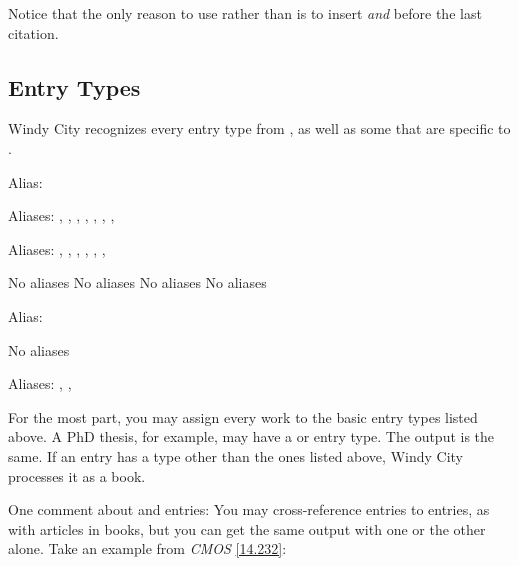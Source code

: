 \documentclass[11pt,letterpaper,oneside]{article}
\begin{document}
Notice that the only reason to use  rather than
 is to insert \textit{and} before the last citation.

\subsection{Entry Types}
\label{entrytypes}

Windy City recognizes every entry type from \BibTeX, as well as some
that are specific to \biblatex.

\begin{typelist}
\RaggedRight


Alias: 


Aliases: , , ,
, , ,
, 


Aliases: , ,
, , ,
, 

 No aliases
 No aliases
 No aliases
 No aliases


Alias: 

 No aliases


Aliases: , ,

\end{typelist}

\noindent For the most part, you may assign every work to the basic
entry types listed above. A PhD thesis, for example, may have a
 or  entry type. The output is the
same. If an entry has a type other than the ones listed above, Windy
City processes it as a book.

One comment about  and 
entries: You may cross-reference  entries to
 entries, as with articles in books, but you can
get the same output with one or the other alone. Take an example from
\textit{CMOS} \ref{14.232}:
\end{document}
